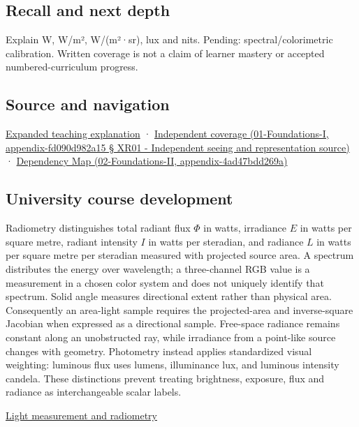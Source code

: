 \subsection{Recall and next depth}\label{recall-and-next-depth}

Explain W, W/m², W/(m²·sr), lux and nits. Pending: spectral/colorimetric calibration. Written coverage is not a claim of learner mastery or accepted numbered-curriculum progress.

\subsection{Source and navigation}\label{source-and-navigation}

\href{Continuous\%20Notes/University\%20-\%20Worlds,\%20Images\%20and\%20Inference\%20-\%20Graphics,\%20Vision\%20and\%20Photography\#Light\%20must\%20become\%20a\%20quantity\%20before\%20it\%20becomes\%20a\%20color}{Expanded teaching explanation} · \href{}{Independent coverage (01-Foundations-I, appendix-fd090d982a15 § XR01 - Independent seeing and representation source)} · \href{}{Dependency Map (02-Foundations-II, appendix-4ad47bdd269a)}

\subsection{University course development}\label{university-course-development}

Radiometry distinguishes total radiant flux \(\Phi\) in watts, irradiance \(E\) in watts per square metre, radiant intensity \(I\) in watts per steradian, and radiance \(L\) in watts per square metre per steradian measured with projected source area. A spectrum distributes the energy over wavelength; a three-channel RGB value is a measurement in a chosen color system and does not uniquely identify that spectrum. Solid angle measures directional extent rather than physical area. Consequently an area-light sample requires the projected-area and inverse-square Jacobian when expressed as a directional sample. Free-space radiance remains constant along an unobstructed ray, while irradiance from a point-like source changes with geometry. Photometry instead applies standardized visual weighting: luminous flux uses lumens, illuminance lux, and luminous intensity candela. These distinctions prevent treating brightness, exposure, flux and radiance as interchangeable scalar labels.

\href{Continuous\%20Notes/University\%20-\%20Worlds,\%20Images\%20and\%20Inference\%20-\%20Graphics,\%20Vision\%20and\%20Photography\#Light\%20measurement\%20and\%20radiometry}{Light measurement and radiometry}
